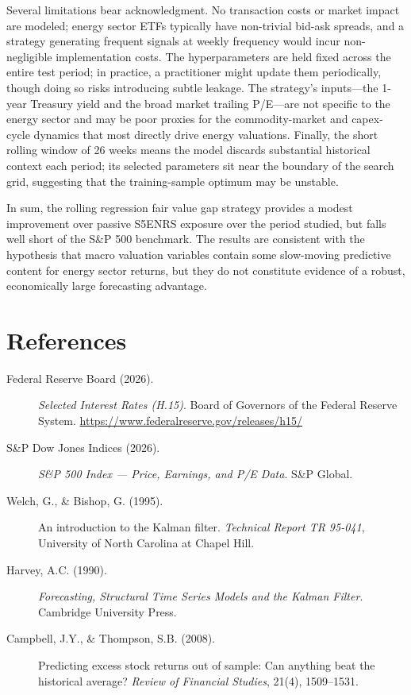 \documentclass[12pt]{article}
\begin{document}
Several limitations bear acknowledgment. No transaction costs or market impact are modeled; energy sector ETFs typically have non-trivial bid-ask spreads, and a strategy generating frequent signals at weekly frequency would incur non-negligible implementation costs. The hyperparameters are held fixed across the entire test period; in practice, a practitioner might update them periodically, though doing so risks introducing subtle leakage. The strategy's inputs—the 1-year Treasury yield and the broad market trailing P/E—are not specific to the energy sector and may be poor proxies for the commodity-market and capex-cycle dynamics that most directly drive energy valuations. Finally, the short rolling window of 26 weeks means the model discards substantial historical context each period; its selected parameters sit near the boundary of the search grid, suggesting that the training-sample optimum may be unstable.

In sum, the rolling regression fair value gap strategy provides a modest improvement over passive S5ENRS exposure over the period studied, but falls well short of the S\&P 500 benchmark. The results are consistent with the hypothesis that macro valuation variables contain some slow-moving predictive content for energy sector returns, but they do not constitute evidence of a robust, economically large forecasting advantage.

\section*{References}

\begin{description}
\item[\normalfont Federal Reserve Board (2026).] \textit{Selected Interest Rates (H.15)}.
  Board of Governors of the Federal Reserve System.
  \url{https://www.federalreserve.gov/releases/h15/}

\item[\normalfont S\&P Dow Jones Indices (2026).] \textit{S\&P 500 Index — Price, Earnings, and P/E Data}.
  S\&P Global.

\item[\normalfont Welch, G., \& Bishop, G. (1995).] An introduction to the Kalman filter.
  \textit{Technical Report TR 95-041}, University of North Carolina at Chapel Hill.

\item[\normalfont Harvey, A.C. (1990).] \textit{Forecasting, Structural Time Series Models and the Kalman Filter}.
  Cambridge University Press.

\item[\normalfont Campbell, J.Y., \& Thompson, S.B. (2008).] Predicting excess stock returns out of sample:
  Can anything beat the historical average?
  \textit{Review of Financial Studies}, 21(4), 1509–1531.
\end{description}
\end{document}
